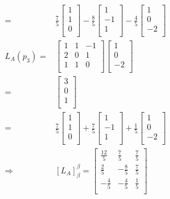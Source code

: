 \documentclass{article}
\begin{document}
\begin{equation*}
\begin{split}
=&\frac{7}{5}\begin{bmatrix}
1\\
1\\
0\\
\end{bmatrix}-\frac{8}{5}\begin{bmatrix}
1\\
-1\\
1\\
\end{bmatrix}-\frac{4}{5}\begin{bmatrix}
1\\
0\\
-2\\
\end{bmatrix}\\
L_A(p_3)=&\begin{bmatrix}
1&1&-1\\
2&0&1\\
1&1&0\\
\end{bmatrix}\begin{bmatrix}
1\\
0\\
-2\\
\end{bmatrix}\\
=&\begin{bmatrix}
3\\
0\\
1\\
\end{bmatrix}\\
=&\frac{7}{5}\begin{bmatrix}
1\\
1\\
0\\
\end{bmatrix}+\frac{7}{5}\begin{bmatrix}
1\\
-1\\
1\\
\end{bmatrix}+\frac{1}{5}\begin{bmatrix}
1\\
0\\
-2\\
\end{bmatrix}\\
\Rightarrow& \left[L_A\right]^\beta_\beta=\begin{bmatrix}
\frac{12}{5}&\frac{7}{5}&\frac{7}{5}\\
\frac{2}{5}&-\frac{8}{5}&\frac{7}{5}\\
-\frac{4}{5}&-\frac{4}{5}&\frac{1}{5}\\
\end{bmatrix}\\
\end{split}
\end{equation*}
\end{document}
